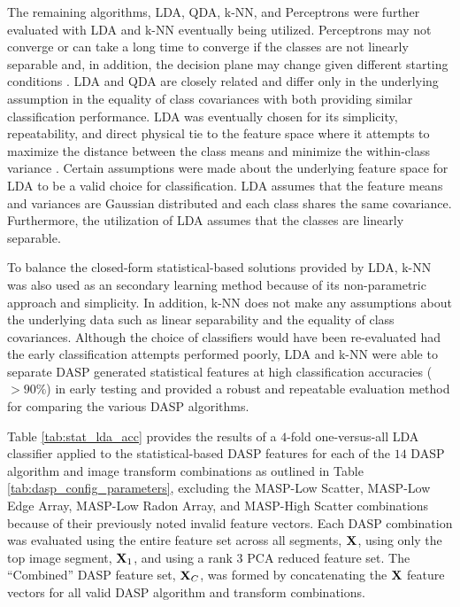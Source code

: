 The remaining algorithms, LDA, QDA, k-NN, and Perceptrons were further evaluated with LDA and k-NN eventually being utilized. Perceptrons may not converge or can take a long time to converge if the classes are not linearly separable and, in addition, the decision plane may change given different starting conditions \cite{Friedman2001}. LDA and QDA are closely related and differ only in the underlying assumption in the equality of class covariances with both providing similar classification performance.  LDA was eventually chosen for its simplicity, repeatability, and direct physical tie to the feature space where it attempts to maximize the distance between the class means and minimize the within-class variance \cite{Friedman2001}.  Certain assumptions were made about the underlying feature space for LDA to be a valid choice for classification.  LDA assumes that the feature means and variances are Gaussian distributed and each class shares the same covariance.  Furthermore, the utilization of LDA assumes that the classes are linearly separable. 

To balance the closed-form statistical-based solutions provided by LDA, k-NN was also used as an secondary learning method because of its non-parametric approach and simplicity.  In addition, k-NN does not make any assumptions about the underlying data such as linear separability and the equality of class covariances.  Although the choice of classifiers would have been re-evaluated had the early classification attempts performed poorly, LDA and k-NN were able to separate DASP generated statistical features at high classification accuracies ($>90\%$) in early testing and provided a robust and repeatable evaluation method for comparing the various DASP algorithms.

Table \ref{tab:stat_lda_acc} provides the results of a $4$-fold one-versus-all LDA classifier applied to the statistical-based DASP features for each of the $14$ DASP algorithm and image transform combinations as outlined in Table \ref{tab:dasp_config_parameters}, excluding the MASP-Low Scatter, MASP-Low Edge Array, MASP-Low Radon Array, and MASP-High Scatter combinations because of their previously noted invalid feature vectors.  Each DASP combination was evaluated using the entire feature set across all segments, $\textit{\bf{X}}$, using only the top image segment, $\textit{\bf{X}}_1$, and using a rank $3$ PCA reduced feature set.  The ``Combined'' DASP feature set, $\textit{\bf{X}}_C$, was formed by concatenating the $\textit{\bf{X}}$ feature vectors for all valid DASP algorithm and transform combinations.

